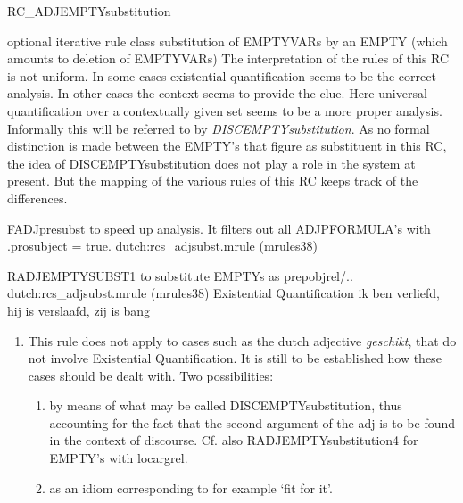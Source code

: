 \begin{mruleclass}{RC\_ADJEMPTYsubstitution}
\begin{classdescr}
\kind optional iterative rule class
\classtask substitution of EMPTYVARs by an EMPTY (which amounts to 
deletion of  EMPTYVARs)
\classremarks
The interpretation of the rules of this RC is not uniform. In some cases 
existential quantification seems to be the correct analysis. In other
cases the context seems to provide the clue. Here universal 
quantification over a contextually given set seems to be a more 
proper analysis. Informally this will be referred to by {\em 
DISCEMPTYsubstitution}. As no formal distinction 
is made between the EMPTY's that 
figure as  
substituent in this RC, the idea of DISCEMPTYsubstitution does not play a
role in the system at present. But the mapping of the various rules of this RC
keeps track of the differences.  

\nofilters
\begin{speedrules}
\begin{member}
 FADJpresubst
 to speed up analysis. It filters out all ADJPFORMULA's
with .prosubject = true.
\file dutch:rcs\_adjsubst.mrule (mrules38)
\end{member}
\end{speedrules}

\end{classdescr}

\begin{members}
\begin{member}
 RADJEMPTYSUBST1
 to substitute EMPTYs as prepobjrel/..
\file dutch:rcs\_adjsubst.mrule (mrules38)
\semantics Existential Quantification
\example ik ben verliefd, hij is verslaafd, zij is bang
\remarks\mbox{}
\begin{enumerate}
\item
This rule does not apply to cases
such as the dutch adjective {\em geschikt}, that do not involve Existential 
Quantification. It is still to be established how
these cases should be dealt with. Two possibilities: 
\begin{enumerate} 
\item by means of what may be called 
DISCEMPTYsubstitution,  thus accounting for the
fact that the second argument of the adj is to be found in the context of
discourse. Cf. also RADJEMPTYsubstitution4 for EMPTY's with locargrel.

\item as an idiom corresponding to for example `fit for it'.
\end{enumerate}


\end{enumerate}
\end{member}
\end{members}
\end{mruleclass}
